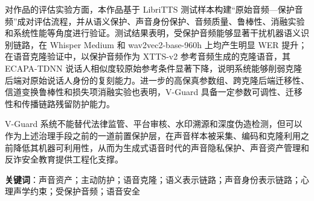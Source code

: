 对作品的评估实验方面，本作品基于 LibriTTS
测试样本构建``原始音频---保护音频''成对评估流程，并从语义保护、声音身份保护、音频质量、鲁棒性、消融实验和系统性能等角度进行验证。测试结果表明，受保护音频能够显著干扰机器语义识别链路，在
Whisper Medium 和 wav2vec2-base-960h 上均产生明显 WER
提升；在语音克隆验证中，以保护音频作为 XTTS-v2
参考音频生成的克隆语音，其 ECAPA-TDNN
说话人相似度较原始参考条件显著下降，说明系统能够削弱克隆后端对原始说话人身份的复刻能力。进一步的高保真参数组、跨克隆后端迁移性、信道变换鲁棒性和损失项消融实验也表明，V-Guard
具备一定参数可调性、迁移性和传播链路残留防护能力。

V-Guard
系统不能替代法律监管、平台审核、水印溯源和深度伪造检测，但可以作为上述治理手段之前的一道前置保护层，在声音样本被采集、编码和克隆利用之前降低其机器可利用性，从而为生成式语音时代的声音隐私保护、声音资产管理和反诈安全教育提供工程化支撑。

\textbf{关键词}：声音资产；主动防护；语音克隆；语义表示链路；声音身份表示链路；心理声学约束；受保护音频；语音安全
